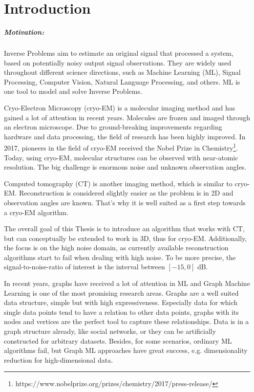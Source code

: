 \chapter{Introduction}
\label{sec:introduction}

\paragraph{Motivation:}
Inverse Problems aim to estimate an original signal that processed a system, 
based on potentially noisy output signal observations.
They are widely used throughout different science directions, such as Machine Learning (ML),
Signal Processing, Computer Vision, Natural Language Processing, and others.
ML is one tool to model and solve Inverse Problems.

Cryo-Electron Microscopy (cryo-EM) is a molecular imaging method and has gained a lot of attention in recent years. 
Molecules are frozen and imaged through an electron microscope.
Due to ground-breaking improvements regarding hardware and data processing, the field of research
has been highly improved. In 2017, pioneers in the field of cryo-EM received the 
Nobel Prize in Chemistry\footnote{https://www.nobelprize.org/prizes/chemistry/2017/press-release/}.
Today, using cryo-EM, molecular structures can be observed with near-atomic resolution.
The big challenge is enormous noise and unknown observation angles.

Computed tomography (CT) is another imaging method, which is similar to cryo-EM. 
Reconstruction is considered slightly easier as the problem is in 2D and observation angles are known.
That's why it is well suited as a first step towards a cryo-EM algorithm.

The overall goal of this Thesis is to introduce an algorithm that works with CT, but 
can conceptually be extended to work in 3D, thus for cryo-EM. 
Additionally, the focus is on the high noise domain, as currently available reconstruction algorithms
start to fail when dealing with high noise. To be more precise, the signal-to-noise-ratio of interest is the interval 
 between $[-15, 0]$ dB.


In recent years, graphs have received a lot of attention in ML and Graph Machine Learning is one of the most promising research areas.
Graphs are a well suited data structure, simple but with high expressiveness. 
Especially data for which single data points tend to have a relation to other data points, graphs with its nodes and vertices are the perfect tool
to capture these relationships. 
Data is in a graph structure already, like social networks, or they can be artificially constructed for arbitrary datasets.
Besides, for some scenarios, ordinary ML algorithms fail, but Graph ML approaches have great success, e.g. dimensionality reduction for high-dimensional data.



